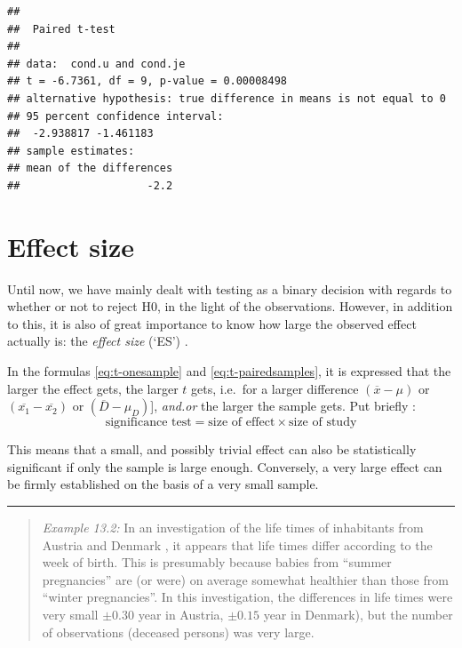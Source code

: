 \documentclass[
]{book}
\begin{document}
\begin{verbatim}
## 
##  Paired t-test
## 
## data:  cond.u and cond.je
## t = -6.7361, df = 9, p-value = 0.00008498
## alternative hypothesis: true difference in means is not equal to 0
## 95 percent confidence interval:
##  -2.938817 -1.461183
## sample estimates:
## mean of the differences 
##                    -2.2
\end{verbatim}

\hypertarget{sec:ttest-effectsize}{%
\section{Effect size}\label{sec:ttest-effectsize}}

Until now, we have mainly dealt with testing as a binary
decision with regards to whether or not to reject H0, in the light
of the observations. However, in addition to this, it is also of great importance
to know how large the observed effect actually is: the \emph{effect size} (`ES')
\citep{Cohen88, Thom02, Naka07}.

In the formulas \eqref{eq:t-onesample} and \eqref{eq:t-pairedsamples}, it is expressed that the larger the effect gets, the larger \(t\) gets,
i.e.~for a larger difference
\((\overline{x}-\mu)\) or \((\overline{x_1}-\overline{x_2})\) or
\((\overline{D}-\mu_D)\){]}, \emph{and.or} the larger the sample gets.
Put briefly \citep[ p.338, formula 11.10]{Rose08}:
\begin{equation}
  \label{eq:Rose08}
    \textrm{significance test} = 
    \textrm{size of effect} \times \textrm{size of study}
\end{equation}

This means
that a small, and possibly trivial effect can also be
statistically significant if only the sample is large enough.
Conversely, a very large effect can be firmly established on the basis of
a very small sample.

\begin{center}\rule{0.5\linewidth}{0.5pt}\end{center}

\begin{quote}
\emph{Example 13.2:}
In an investigation of the life times of inhabitants from Austria
and Denmark \citep{Dobl99}, it appears that life times differ according to
the week of birth. This is presumably because babies from ``summer pregnancies''
are (or were) on average somewhat healthier than those
from ``winter pregnancies''. In this investigation, the differences
in life times were very small \(\pm 0.30\) year in Austria, \(\pm 0.15\) year
in Denmark), but the number of observations (deceased persons) was very large.
\end{quote}
\end{document}
